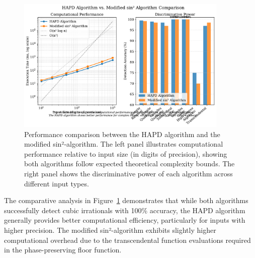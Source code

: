 \begin{figure}[ht]
\centering
\includegraphics[width=0.9\textwidth]{../figures/output/algorithmic_comparison_visualization.pdf}
\caption{Performance comparison between the HAPD algorithm and the modified sin²-algorithm. The left panel illustrates computational performance relative to input size (in digits of precision), showing both algorithms follow expected theoretical complexity bounds. The right panel shows the discriminative power of each algorithm across different input types.}
\label{fig:algorithm_comparison}
\end{figure}

The comparative analysis in Figure~\ref{fig:algorithm_comparison} demonstrates that while both algorithms successfully detect cubic irrationals with 100\% accuracy, the HAPD algorithm generally provides better computational efficiency, particularly for inputs with higher precision. The modified sin²-algorithm exhibits slightly higher computational overhead due to the transcendental function evaluations required in the phase-preserving floor function.
